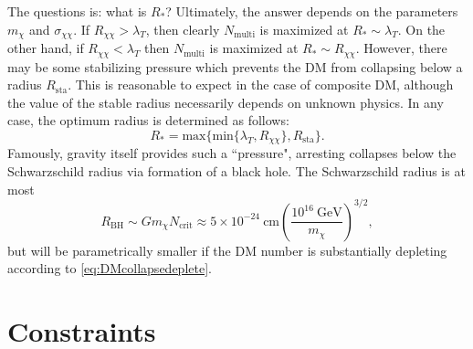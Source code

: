 \documentclass[preprintnumbers,amsmath,amssymb,prd,superscriptaddress]{revtex4}
\newcommand{\GeV}{\text{GeV}}
\newcommand{\cm}{\text{cm}}
\def\r{\right)}
\def\l{\left(}
\begin{document}
The questions is: what is $R_*$?
Ultimately, the answer depends on the parameters $m_\chi$ and $\sigma_{\chi \chi}$. 
If $R_{\chi \chi} > \lambda_T$, then clearly $N_\text{multi}$ is maximized at $R_* \sim \lambda_T$.
On the other hand, if $R_{\chi \chi} < \lambda_T$ then $N_\text{multi}$ is maximized at $R_* \sim R_{\chi \chi}$.
However, there may be some stabilizing pressure which prevents the DM from collapsing below a radius $R_\text{sta}$.
This is reasonable to expect in the case of composite DM, although the value of the stable radius necessarily depends on unknown physics. 
In any case, the optimum radius is determined as follows:
\begin{equation}
R_* = \text{max}\{\text{min}\{\lambda_T, R_{\chi \chi}\}, R_\text{sta}\}.
\end{equation}
Famously, gravity itself provides such a ``pressure", arresting collapses below the Schwarzschild radius via formation of a black hole. 
The Schwarzschild radius is at most
\begin{equation}
R_\text{BH} \sim G m_\chi N_\text{crit} \approx 5 \times 10^{-24} ~\cm \l \frac{10^{16} ~\GeV}{m_\chi} \r^{3/2},
\end{equation}
but will be parametrically smaller if the DM number is substantially depleting according to \eqref{eq:DMcollapsedeplete}.

\section{Constraints}
\end{document}

